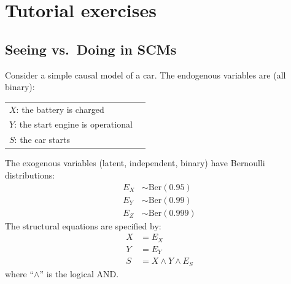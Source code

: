 \documentclass{article}
\begin{document}
\clearpage
\section{Tutorial exercises}

\subsection{Seeing vs.\ Doing in SCMs}

Consider a simple causal model of a car. The endogenous variables are (all binary):
\begin{center}
\begin{tabular}{ll}
    $X$: the battery is charged \\
    $Y$: the start engine is operational \\
    $S$: the car starts
\end{tabular}\end{center}
The exogenous variables (latent, independent, binary) have Bernoulli distributions:
  \begin{align*}
    E_X &\sim \mathrm{Ber}(0.95) \\
    E_Y &\sim \mathrm{Ber}(0.99) \\
    E_Z &\sim \mathrm{Ber}(0.999)
  \end{align*}
The structural equations are specified by:
  \begin{align*}
    X &= E_X \\
    Y &= E_Y \\
    S &= X \land Y \land E_S
  \end{align*}
where ``$\land$'' is the logical AND.
\end{document}

